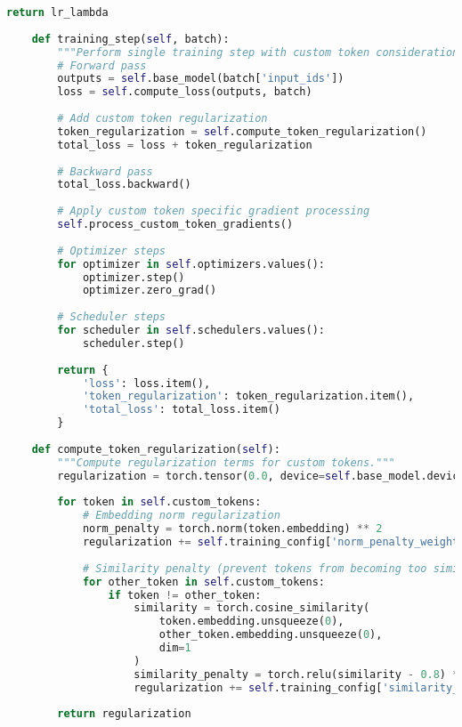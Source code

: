 \begin{lstlisting}[language=Python, caption=Progressive custom token integration]
        return lr_lambda
    
    def training_step(self, batch):
        """Perform single training step with custom token considerations."""
        # Forward pass
        outputs = self.base_model(batch['input_ids'])
        loss = self.compute_loss(outputs, batch)
        
        # Add custom token regularization
        token_regularization = self.compute_token_regularization()
        total_loss = loss + token_regularization
        
        # Backward pass
        total_loss.backward()
        
        # Apply custom token specific gradient processing
        self.process_custom_token_gradients()
        
        # Optimizer steps
        for optimizer in self.optimizers.values():
            optimizer.step()
            optimizer.zero_grad()
        
        # Scheduler steps
        for scheduler in self.schedulers.values():
            scheduler.step()
        
        return {
            'loss': loss.item(),
            'token_regularization': token_regularization.item(),
            'total_loss': total_loss.item()
        }
    
    def compute_token_regularization(self):
        """Compute regularization terms for custom tokens."""
        regularization = torch.tensor(0.0, device=self.base_model.device)
        
        for token in self.custom_tokens:
            # Embedding norm regularization
            norm_penalty = torch.norm(token.embedding) ** 2
            regularization += self.training_config['norm_penalty_weight'] * norm_penalty
            
            # Similarity penalty (prevent tokens from becoming too similar)
            for other_token in self.custom_tokens:
                if token != other_token:
                    similarity = torch.cosine_similarity(
                        token.embedding.unsqueeze(0),
                        other_token.embedding.unsqueeze(0),
                        dim=1
                    )
                    similarity_penalty = torch.relu(similarity - 0.8) ** 2
                    regularization += self.training_config['similarity_penalty_weight'] * similarity_penalty
        
        return regularization
\end{lstlisting}


